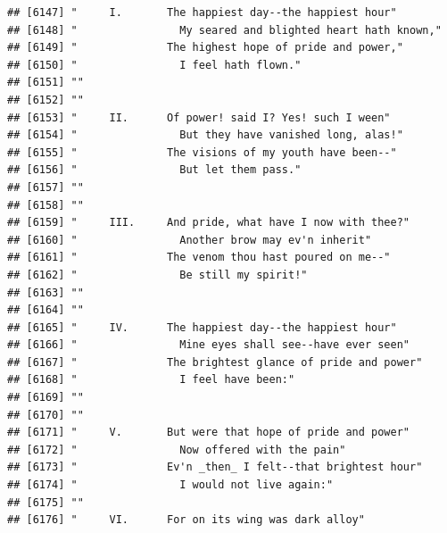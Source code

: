 \documentclass{article}\usepackage[]{graphicx}\usepackage[]{color}
\makeatletter
\newenvironment{kframe}{%
 \def\at@end@of@kframe{}%
 \ifinner\ifhmode%
  \def\at@end@of@kframe{\end{minipage}}%
  \begin{minipage}{\columnwidth}%
 \fi\fi%
 \def\FrameCommand##1{\hskip\@totalleftmargin \hskip-\fboxsep
 \colorbox{shadecolor}{##1}\hskip-\fboxsep
     \hskip-\linewidth \hskip-\@totalleftmargin \hskip\columnwidth}%
 \MakeFramed {\advance\hsize-\width
   \@totalleftmargin\z@ \linewidth\hsize
   \@setminipage}}%
 {\par\unskip\endMakeFramed%
 \at@end@of@kframe}
\newenvironment{knitrout}{}{} %
\makeatother
\begin{document}
\begin{knitrout}
\begin{kframe}
\begin{verbatim}
## [6147] "     I.       The happiest day--the happiest hour"                           
## [6148] "                My seared and blighted heart hath known,"                    
## [6149] "              The highest hope of pride and power,"                          
## [6150] "                I feel hath flown."                                          
## [6151] ""                                                                            
## [6152] ""                                                                            
## [6153] "     II.      Of power! said I? Yes! such I ween"                            
## [6154] "                But they have vanished long, alas!"                          
## [6155] "              The visions of my youth have been--"                           
## [6156] "                But let them pass."                                          
## [6157] ""                                                                            
## [6158] ""                                                                            
## [6159] "     III.     And pride, what have I now with thee?"                         
## [6160] "                Another brow may ev'n inherit"                               
## [6161] "              The venom thou hast poured on me--"                            
## [6162] "                Be still my spirit!"                                         
## [6163] ""                                                                            
## [6164] ""                                                                            
## [6165] "     IV.      The happiest day--the happiest hour"                           
## [6166] "                Mine eyes shall see--have ever seen"                         
## [6167] "              The brightest glance of pride and power"                       
## [6168] "                I feel have been:"                                           
## [6169] ""                                                                            
## [6170] ""                                                                            
## [6171] "     V.       But were that hope of pride and power"                         
## [6172] "                Now offered with the pain"                                   
## [6173] "              Ev'n _then_ I felt--that brightest hour"                       
## [6174] "                I would not live again:"                                     
## [6175] ""                                                                            
## [6176] "     VI.      For on its wing was dark alloy"                                

\end{verbatim}
\end{kframe}
\end{knitrout}
\end{document}
